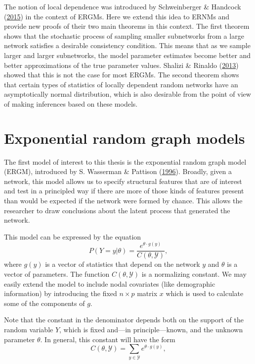 \documentclass[12pt,twoside]{reedthesis}
\theoremstyle{definition}
\theoremstyle{definition}
\theoremstyle{remark}
\begin{document}
The notion of local dependence was introduced by Schweinberger \&
Handcock (\protect\hyperlink{ref-Schweinberger2015}{2015}) in the
context of ERGMs. Here we extend this idea to ERNMs and provide new
proofs of their two main theorems in this context. The first theorem
shows that the stochastic process of sampling smaller subnetworks from a
large network satisfies a desirable consistency condition. This means
that as we sample larger and larger subnetworks, the model parameter
estimates become better and better approximations of the true parameter
values. Shalizi \& Rinaldo (\protect\hyperlink{ref-Shalizi2013}{2013})
showed that this is not the case for most ERGMs. The second theorem
shows that certain types of statistics of locally dependent random
networks have an asymptotically normal distribution, which is also
desirable from the point of view of making inferences based on these
models.

\chapter{Exponential random graph
models}\label{exponential-random-graph-models}

The first model of interest to this thesis is the exponential random
graph model (ERGM), introduced by S. Wasserman \& Pattison
(\protect\hyperlink{ref-Wasserman1996}{1996}). Broadly, given a network,
this model allows us to specify structural features that are of interest
and test in a principled way if there are more of those kinds of
features present than would be expected if the network were formed by
chance. This allows the researcher to draw conclusions about the latent
process that generated the network.

This model can be expressed by the equation
\begin{equation}
  P(Y = y | \theta) = \frac{e^{\theta \cdot g(y)}}{C(\theta, \mathcal{Y})}
  \label{eq:ergm},
\end{equation}
where \(g(y)\) is a vector of statistics that depend on the network
\(y\) and \(\theta\) is a vector of parameters. The function
\(C(\theta, \mathcal{Y})\) is a normalizing constant. We may easily
extend the model to include nodal covariates (like demographic
information) by introducing the fixed \(n \times p\) matrix \(x\) which
is used to calculate some of the components of \(g\).

Note that the constant in the denominator depends both on the support of
the random variable \(Y\), which is fixed and---in principle---known,
and the unknown parameter \(\theta\). In general, this constant will
have the form
\begin{equation} C(\theta, \mathcal{Y}) = \sum_{y \in \mathcal{Y}} e^{\theta
\cdot g(y)}, \label{eq:constant} \end{equation}
\end{document}
